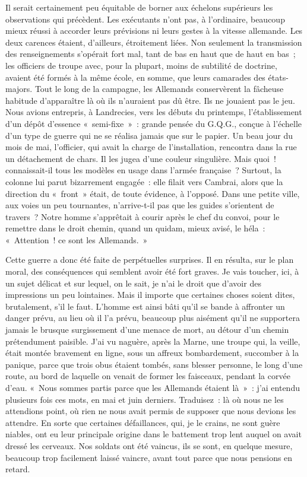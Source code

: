 \documentclass[french,twoside]{book} %
\begin{document}
Il serait certainement peu équitable de borner aux échelons supérieurs les observations qui précèdent. Les exécutants n’ont pas, à l’ordinaire, beaucoup mieux réussi à accorder leurs prévisions ni leurs gestes à la vitesse allemande. Les deux carences étaient, d’ailleurs, étroitement liées. Non seulement la transmission des renseignements s’opérait fort mal, tant de bas en haut que de haut en bas ; les officiers de troupe avec, pour la plupart, moins de subtilité de doctrine, avaient été formés à la même école, en somme, que leurs camarades des états-majors. Tout le long de la campagne, les Allemands conservèrent la fâcheuse habitude d’apparaître là où ils n’auraient pas dû être. Ils ne jouaient pas le jeu. Nous avions entrepris, à Landrecies, vers les débuts du printemps, l’établissement d’un dépôt d’essence « semi-fixe » : grande pensée du G.Q.G., conçue à l’échelle d’un type de guerre qui ne se réalisa jamais que sur le papier. Un beau jour du mois de mai, l’officier, qui avait la charge de l’installation, rencontra dans la rue un détachement de chars. Il les jugea d’une couleur singulière. Mais quoi ! connaissait-il tous les modèles en usage dans l’armée française ? Surtout, la colonne lui parut bizarrement engagée : elle filait vers Cambrai, alors que la direction du « front » était, de toute évidence, à l’opposé. Dans une petite ville, aux voies un peu tournantes, n’arrive-t-il pas que les guides s’orientent de travers ? Notre homme s’apprêtait à courir après le chef   du convoi, pour le remettre dans le droit chemin, quand un quidam, mieux avisé, le héla : « Attention ! ce sont les Allemands. »\par
Cette guerre a donc été faite de perpétuelles surprises. Il en résulta, sur le plan moral, des conséquences qui semblent avoir été fort graves. Je vais toucher, ici, à un sujet délicat et sur lequel, on le sait, je n’ai le droit que d’avoir des impressions un peu lointaines. Mais il importe que certaines choses soient dites, brutalement, s’il le faut. L’homme est ainsi bâti qu’il se bande à affronter un danger prévu, au lieu où il l’a prévu, beaucoup plus aisément qu’il ne supportera jamais le brusque surgissement d’une menace de mort, au détour d’un chemin prétendument paisible. J’ai vu naguère, après la Marne, une troupe qui, la veille, était montée bravement en ligne, sous un affreux bombardement, succomber à la panique, parce que trois obus étaient tombés, sans blesser personne, le long d’une route, au bord de laquelle on venait de former les faisceaux, pendant la corvée d’eau. « Nous sommes partis parce que les Allemands étaient là » : j’ai entendu plusieurs fois ces mots, en mai et juin derniers. Traduisez : là où nous ne les attendions point, où rien ne nous avait permis de supposer que nous devions les attendre. En sorte que certaines défaillances, qui, je le crains, ne sont guère niables, ont eu leur principale origine dans le battement trop lent auquel on avait dressé les cerveaux. Nos soldats ont été vaincus, ils se sont, en quelque mesure, beaucoup trop facilement laissé vaincre, avant tout parce que nous pensions en retard.\par
\end{document}
